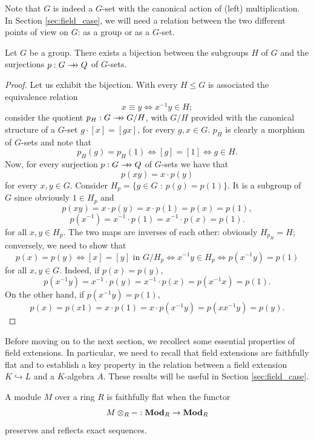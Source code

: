 Note that $G$ is indeed a $G$-set with the canonical action of (left) multiplication. In Section \ref{sec:field_case}, we will need a relation between the two different points of view on $G$: as a group or as a $G$-set.
\begin{proposition}
\label{prop:BijectionSubgruopsQuotients}
    Let $G$ be a group. There exists a bijection between the subgroups $H$ of $G$ and the surjections $p:G\rrightarrow Q$ of $G$-sets.
    \begin{proof}
        Let us exhibit the bijection. With every $H\leq G$ is associated the equivalence relation
        \[ x\equiv y \iff x^{-1}y\in H; \]
        consider the quotient $p_H:G\rrightarrow G/H$, with $G/H$ provided with the canonical structure of a $G$-set $g\cdot[x] = [gx]$, for every $g,x\in G$. $p_H$ is clearly a morphism of $G$-sets and note that
        \[ p_H(g)=p_H(1)\iff[g]=[1]\iff g\in H.\]
        Now, for every surjection $p:G\rrightarrow Q$ of $G$-sets we have that
        \[ p(xy) = x\cdot p(y) \]
        for every $x,y\in G$. Consider $H_p = \{g\in G\text{ : }p(g) = p(1)\}$. It is a subgroup of $G$ since obviously $1\in H_p$ and
        \[ p(xy) = x\cdot p(y) = x\cdot p(1) = p(x) = p(1), \]
        \[ p(x^{-1}) = x^{-1}\cdot p(1) = x^{-1}\cdot p(x) = p(1). \]
        for all $x, y \in H_p$. The two maps are inverses of each other: obviously $H_{p_H} = H$; conversely, we need to show that
        \[ p(x) = p(y) \iff [x] = [y] \text{ in }G/H_p \iff x^{-1}y\in H_p \iff p(x^{-1}y)=p(1) \]
        for all $x,y \in G$. Indeed, if $p(x) = p(y)$,
        \[ p(x^{-1}y) = x^{-1}\cdot p(y) = x^{-1} \cdot p(x) = p(x^{-1}x) = p(1). \]
        On the other hand, if $p(x^{-1}y)=p(1)$,
        \[ p(x) = p(x1) = x\cdot p(1) = x\cdot p(x^{-1}y) = p(xx^{-1}y) = p(y). \]
    \end{proof}
\end{proposition}

Before moving on to the next section, we recollect some essential properties of field extensions. In particular, we need to recall that field extensions are faithfully flat and to establish a key property in the relation between a field extension $K\hookrightarrow L$ and a $K$-algebra $A$. These results will be useful in Section \ref{sec:field_case}.

\begin{definition}
    A module $M$ over a ring $R$ is faithfully flat when the functor
    \[ M\otimes_{R}-:\textbf{Mod}_R\to \textbf{Mod}_R \]
    preserves and reflects exact sequences.
\end{definition}

